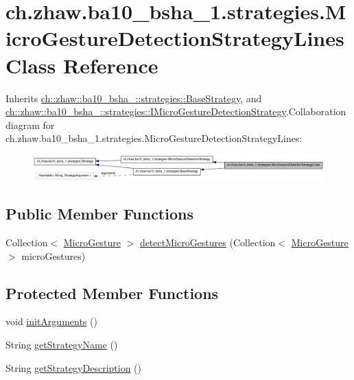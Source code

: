 \hypertarget{classch_1_1zhaw_1_1ba10__bsha__1_1_1strategies_1_1MicroGestureDetectionStrategyLines}{
\section{ch.zhaw.ba10\_\-bsha\_\-1.strategies.MicroGestureDetectionStrategyLines Class Reference}
\label{classch_1_1zhaw_1_1ba10__bsha__1_1_1strategies_1_1MicroGestureDetectionStrategyLines}
}


Inherits \hyperlink{classch_1_1zhaw_1_1ba10__bsha__1_1_1strategies_1_1BaseStrategy}{ch::zhaw::ba10\_\-bsha\_::strategies::BaseStrategy}, and \hyperlink{interfacech_1_1zhaw_1_1ba10__bsha__1_1_1strategies_1_1IMicroGestureDetectionStrategy}{ch::zhaw::ba10\_\-bsha\_::strategies::IMicroGestureDetectionStrategy}.Collaboration diagram for ch.zhaw.ba10\_\-bsha\_\-1.strategies.MicroGestureDetectionStrategyLines:\nopagebreak
\begin{figure}[H]
\begin{center}
\leavevmode
\includegraphics[width=400pt]{classch_1_1zhaw_1_1ba10__bsha__1_1_1strategies_1_1MicroGestureDetectionStrategyLines__coll__graph}
\end{center}
\end{figure}
\subsection*{Public Member Functions}
\begin{DoxyCompactItemize}
\item 
Collection$<$ \hyperlink{classch_1_1zhaw_1_1ba10__bsha__1_1_1service_1_1MicroGesture}{MicroGesture} $>$ \hyperlink{classch_1_1zhaw_1_1ba10__bsha__1_1_1strategies_1_1MicroGestureDetectionStrategyLines_ac4a6ad22e6ca3b595006c0b956fdd208}{detectMicroGestures} (Collection$<$ \hyperlink{classch_1_1zhaw_1_1ba10__bsha__1_1_1service_1_1MicroGesture}{MicroGesture} $>$ microGestures)
\end{DoxyCompactItemize}
\subsection*{Protected Member Functions}
\begin{DoxyCompactItemize}
\item 
void \hyperlink{classch_1_1zhaw_1_1ba10__bsha__1_1_1strategies_1_1MicroGestureDetectionStrategyLines_a2c3a3cda170672d79a797c0d3060e9d7}{initArguments} ()
\item 
String \hyperlink{classch_1_1zhaw_1_1ba10__bsha__1_1_1strategies_1_1MicroGestureDetectionStrategyLines_a9e856240313caac95a363e99bfac2474}{getStrategyName} ()
\item 
String \hyperlink{classch_1_1zhaw_1_1ba10__bsha__1_1_1strategies_1_1MicroGestureDetectionStrategyLines_a268ab1d51d959092f2d9a68044cc818d}{getStrategyDescription} ()
\end{DoxyCompactItemize}

